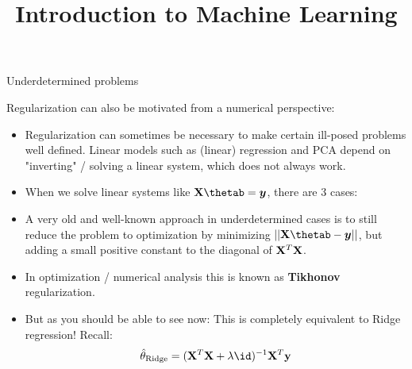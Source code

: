 \documentclass[11pt,compress,t,notes=noshow, xcolor=table]{beamer}
\title{Introduction to Machine Learning}
\date{}
\begin{document}


\begin{vbframe} {Underdetermined problems}

Regularization can also be motivated from a numerical perspective: 

  \begin{itemize}
    \item Regularization can sometimes be necessary to make certain ill-posed problems well defined. Linear models such as (linear) regression and PCA depend on "inverting" / solving a linear system, which does not always work.
    \item When we solve linear systems like $\Xmat \thetab = \bm{y}$, there are 3 cases:  
  \begin{enumerate}
  \end{enumerate}
  \end{itemize}

\framebreak
  \begin{itemize}
   \item A very old and well-known approach in underdetermined cases is to still reduce the problem to optimization by minimizing $|| \Xmat \thetab - \bm{y}||$, but adding a small positive constant to the diagonal of $\mathbf{X}^T \mathbf{X}$.
   \item In optimization / numerical analysis this is known as \textbf{Tikhonov} regularization. 
   \item But as you should be able to see now: This is completely equivalent to Ridge regression! Recall:
   $$\thetah_{\text{Ridge}} = ({\Xmat}^T \Xmat  + \lambda \id)^{-1} \Xmat^T\yv$$
  \end{itemize}


\end{vbframe}
\end{document}
